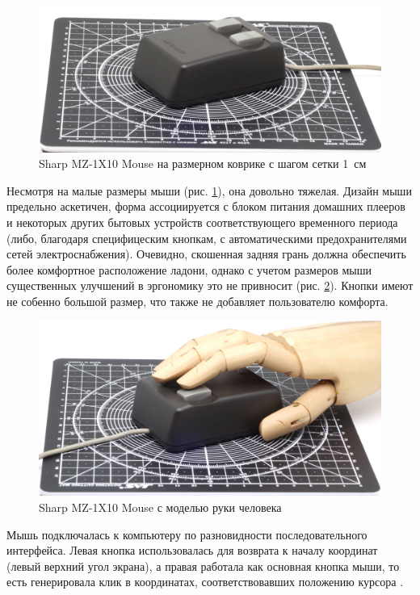 \documentclass[11pt, a4paper]{article}
\begin{document}
\begin{figure}[h]
    \centering
    \includegraphics[scale=0.5]{1983_sharp_mz_1x10_mouse/size_30.jpg}
    \caption{Sharp MZ-1X10 Mouse на размерном коврике с шагом сетки 1~см}
    \label{fig:SharpMZ1x10Size}
\end{figure}

Несмотря на малые размеры мыши (рис. \ref{fig:SharpMZ1x10Size}), она довольно тяжелая. Дизайн мыши предельно аскетичен, форма ассоциируется с блоком питания домашних плееров и некоторых других бытовых устройств соответствующего временного периода (либо, благодаря специфицеским кнопкам, с автоматическими предохранителями сетей электроснабжения). Очевидно, скошенная задняя грань должна обеспечить более комфортное расположение ладони, однако с учетом размеров мыши существенных улучшений в эргономику это не привносит (рис. \ref{fig:SharpMZ1x10Hand}). Кнопки имеют не собенно большой размер, что также не добавляет пользователю комфорта.

\begin{figure}[h]
    \centering
    \includegraphics[scale=0.5]{1983_sharp_mz_1x10_mouse/hand_30.jpg}
    \caption{Sharp MZ-1X10 Mouse с моделью руки человека}
    \label{fig:SharpMZ1x10Hand}
\end{figure}

Мышь подключалась к компьютеру по разновидности последовательного интерфейса. Левая кнопка использовалась для возврата к началу координат (левый верхний угол экрана), а правая работала как основная кнопка мыши, то есть генерировала клик в координатах, соответствовавших положению курсора \cite{manual}.
\end{document}
